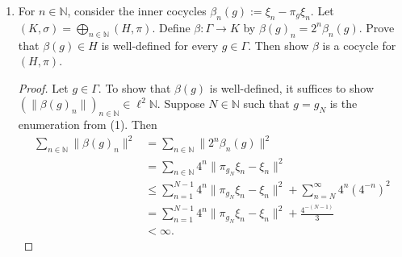\documentclass[a4paper,10pt]{report}
\newcommand{\N}{\mathbb{N}}
\begin{document}
\begin{enumerate}
\begin{enumerate}
\begin{proof}
					Replacing $(\xi_n)_{n \in \N}$ with $(\xi_{n_k})_{k \in \N}$
					gives a sequence of unit vectors with the desired property.
				\end{proof}
			\item For $n \in \N$, consider the inner cocycles $\beta_n(g) := \xi_n - \pi_g\xi_n$.
				Let $(K, \sigma) = \bigoplus_{n \in \N}{(H, \pi)}$.
				Define $\beta : \Gamma \to K$ by $\beta(g)_n = 2^n \beta_n(g)$.
				Prove that $\beta(g) \in H$ is well-defined for every $g \in \Gamma$.
				Then show $\beta$ is a cocycle for $(H, \pi)$.
				\begin{proof}
					Let $g \in \Gamma$.
					To show that $\beta(g)$ is well-defined, it suffices to show
					$\left( \|\beta(g)_n\| \right)_{n \in \N} \in \ell^2\N$.
					Suppose $N \in \N$ such that $g = g_N$ is the enumeration from (1).
					Then
					\begin{align*}
						\sum_{n \in \N}{\|\beta(g)_n\|^2} & = \sum_{n \in \N}{\|2^n \beta_n(g)\|^2} \\
						 & = \sum_{n \in \N}{4^n \|\pi_{g_N} \xi_n - \xi_n\|^2} \\
						 & \le \sum_{n=1}^{N-1}{4^n \|\pi_{g_N} \xi_n - \xi_n\|^2} 
						 + \sum_{n=N}^{\infty}{4^n (4^{-n})^2} \\
						 & = \sum_{n=1}^{N-1}{4^n \|\pi_{g_N} \xi_n - \xi_n\|^2}
						 + \frac{4^{-(N-1)}}{3} \\
						 & < \infty.
					\end{align*}
					

\end{proof}
\end{enumerate}
\end{enumerate}
\end{document}
